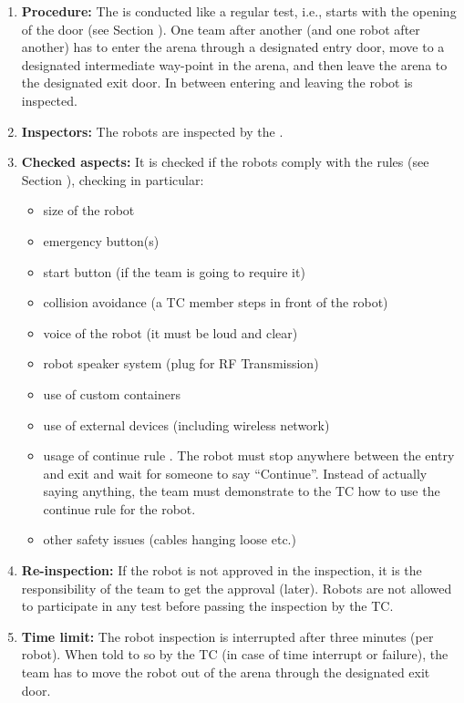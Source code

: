 \begin{enumerate}
	\item \textbf{Procedure:} The  is conducted like a regular test, i.e., starts with the opening of the door (see Section ). One team after another (and one robot after another) has to enter the arena through a designated entry door, move to a designated intermediate way-point in the arena, and then leave the arena to the designated exit door. In between entering and leaving the robot is inspected.
	\item \textbf{Inspectors:} The robots are inspected by the .
	\item \textbf{Checked aspects:} It is checked if the robots comply with the rules (see Section ), checking in particular:
	\begin{itemize}
		\item size of the robot
		\item emergency button(s)
		\item start button (if the team is going to require it)
		\item collision avoidance (a TC member steps in front of the robot)
		\item voice of the robot (it must be loud and clear)
		\item robot speaker system (plug for RF Transmission)
		\item use of custom containers 
		\item use of external devices (including wireless network)
		\item usage of continue rule . The robot must stop anywhere between the entry and exit and wait for someone to say ``Continue''. Instead of actually saying anything, the team must demonstrate to the TC how to use the continue rule for the robot. 
		\item other safety issues (cables hanging loose etc.)
	\end{itemize}
	\item \textbf{Re-inspection:} If the robot is not approved in the inspection, it is the responsibility of the team to get the approval (later). Robots are not allowed to participate in any test before passing the inspection by the TC.
	\item \textbf{Time limit:} The robot inspection is interrupted after three minutes (per robot). When told to so by the TC (in case of time interrupt or failure), the team has to move the robot out of the arena through the designated exit door.

\end{enumerate}
